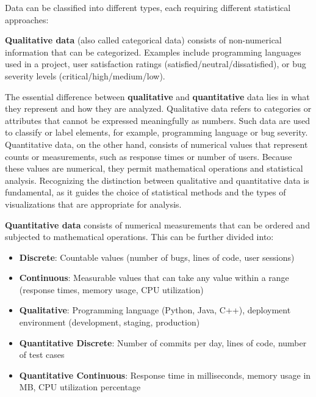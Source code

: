 Data can be classified into different types, each requiring different statistical approaches:

\begin{definition}
\textbf{Qualitative data} (also called categorical data) consists of non-numerical information that can be categorized. Examples include programming languages used in a project, user satisfaction ratings (satisfied/neutral/dissatisfied), or bug severity levels (critical/high/medium/low).
\end{definition}

The essential difference between \textbf{qualitative} and \textbf{quantitative} data lies in what they represent and how they are analyzed. Qualitative data refers to categories or attributes that cannot be expressed meaningfully as numbers. Such data are used to classify or label elements, for example, programming language or bug severity. Quantitative data, on the other hand, consists of numerical values that represent counts or measurements, such as response times or number of users. Because these values are numerical, they permit mathematical operations and statistical analysis. Recognizing the distinction between qualitative and quantitative data is fundamental, as it guides the choice of statistical methods and the types of visualizations that are appropriate for analysis.

\begin{definition}
\textbf{Quantitative data} consists of numerical measurements that can be ordered and subjected to mathematical operations. This can be further divided into:
\begin{itemize}
    \item \textbf{Discrete}: Countable values (number of bugs, lines of code, user sessions)
    \item \textbf{Continuous}: Measurable values that can take any value within a range (response times, memory usage, CPU utilization)
\end{itemize}
\end{definition}

\begin{example}
\begin{itemize}
    \item \textbf{Qualitative}: Programming language (Python, Java, C++), deployment environment (development, staging, production)
    \item \textbf{Quantitative Discrete}: Number of commits per day, lines of code, number of test cases
    \item \textbf{Quantitative Continuous}: Response time in milliseconds, memory usage in MB, CPU utilization percentage
\end{itemize}
\end{example}

